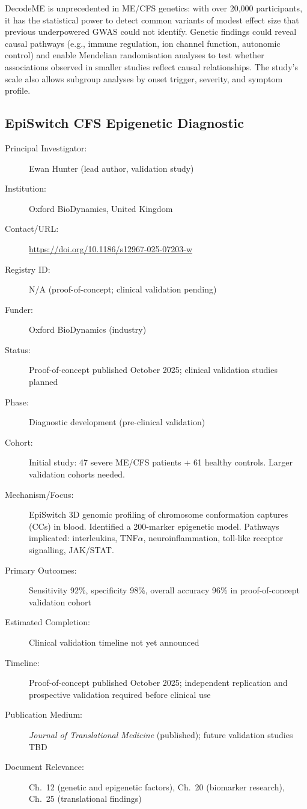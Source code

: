 DecodeME is unprecedented in ME/CFS genetics: with over 20,000 participants,
it has the statistical power to detect common variants of modest effect size
that previous underpowered GWAS could not identify.  Genetic findings could
reveal causal pathways (e.g., immune regulation, ion channel function,
autonomic control) and enable Mendelian randomisation analyses to test whether
associations observed in smaller studies reflect causal relationships.
The study's scale also allows subgroup analyses by onset trigger, severity,
and symptom profile.

\subsection{EpiSwitch CFS Epigenetic Diagnostic}
\label{sec:registry-episwitch}

\begin{description}
    \item[Principal Investigator:] Ewan Hunter (lead author, validation study)
    \item[Institution:] Oxford BioDynamics, United Kingdom
    \item[Contact/URL:] \url{https://doi.org/10.1186/s12967-025-07203-w}
    \item[Registry ID:] N/A (proof-of-concept; clinical validation pending)
    \item[Funder:] Oxford BioDynamics (industry)
    \item[Status:] Proof-of-concept published October 2025; clinical
        validation studies planned
    \item[Phase:] Diagnostic development (pre-clinical validation)
    \item[Cohort:] Initial study: 47 severe ME/CFS patients + 61 healthy
        controls.  Larger validation cohorts needed.
    \item[Mechanism/Focus:] EpiSwitch 3D genomic profiling of chromosome
        conformation captures (CCs) in blood.  Identified a 200-marker
        epigenetic model.  Pathways implicated: interleukins, TNF$\alpha$,
        neuroinflammation, toll-like receptor signalling, JAK/STAT.
    \item[Primary Outcomes:] Sensitivity 92\%, specificity 98\%, overall
        accuracy 96\% in proof-of-concept validation cohort
    \item[Estimated Completion:] Clinical validation timeline not yet
        announced
    \item[Timeline:] Proof-of-concept published October 2025; independent
        replication and prospective validation required before clinical use
    \item[Publication Medium:] \textit{Journal of Translational Medicine}
        (published); future validation studies TBD
    \item[Document Relevance:] Ch.~12 (genetic and epigenetic factors),
        Ch.~20 (biomarker research), Ch.~25 (translational findings)
\end{description}

